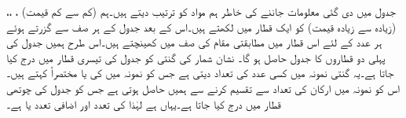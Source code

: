 جدول  میں دی گئی معلومات جاننے کی خاطر ہم مواد کو ترتیب دیتے ہیں۔ہم (کم سے کم قیمت) ، ،،  (زیادہ سے زیادہ قیمت) کو ایک قطار میں لکھتے ہیں۔اس کے بعد جدول  کے ہر صف سے گزرتے ہوئے ہر عدد کے لئے اس قطار میں مطابقتی مقام کی صف میں  کھینچتے ہیں۔اس طرح ہمیں جدول  کی پہلی دو قطاروں  کا جدول حاصل ہو گا۔ نشان شمار کی گنتی کو جدول کی تیسری قطار میں درج کیا جاتا ہے۔یہ گنتی نمونہ میں  کسی عدد  کی تعداد دیتی ہے جس کو نمونہ میں  کی  یا مختصراً  کہتے ہیں۔اس کو نمونہ میں ارکان کی تعداد  سے تقسیم کرنے سے ہمیں  حاصل ہوتی ہے جس کو جدول  کی چوتھی قطار میں درج کیا جاتا ہے۔یہاں  ہے لہٰذا کی تعدد  اور اضافی تعدد  یا  ہے۔
